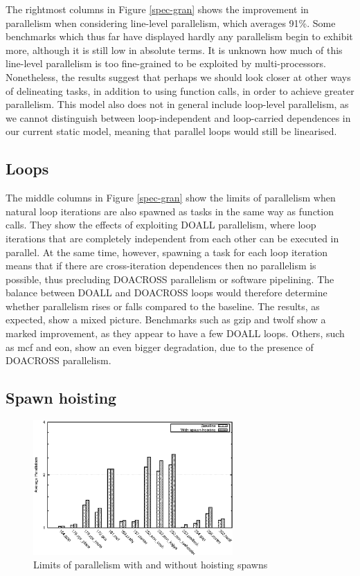 The rightmost columns in Figure \ref{spec-gran} shows the improvement in parallelism when considering line-level parallelism, which averages 91\%.
Some benchmarks which thus far have displayed hardly any parallelism begin to exhibit more, although it is still low in absolute terms.
It is unknown how much of this line-level parallelism is too fine-grained to be exploited by multi-processors.
Nonetheless, the results suggest that perhaps we should look closer at other ways of delineating tasks, in addition to using function calls, in order to achieve greater parallelism.
This model also does not in general include loop-level parallelism, as we cannot distinguish between loop-independent and loop-carried dependences in our current static model, meaning that parallel loops would still be linearised.

\subsection{Loops}

The middle columns in Figure \ref{spec-gran} show the limits of parallelism when natural loop iterations are also spawned as tasks in the same way as function calls.
They show the effects of exploiting DOALL parallelism, where loop iterations that are completely independent from each other can be executed in parallel.
At the same time, however, spawning a task for each loop iteration means that if there are cross-iteration dependences then no parallelism is possible, thus precluding DOACROSS parallelism or software pipelining.
The balance between DOALL and DOACROSS loops would therefore determine whether parallelism rises or falls compared to the baseline.
The results, as expected, show a mixed picture.
Benchmarks such as gzip and twolf show a marked improvement, as they appear to have a few DOALL loops.
Others, such as mcf and eon, show an even bigger degradation, due to the presence of DOACROSS parallelism.

\subsection{Spawn hoisting}

\begin{figure}
 \centering
 \includegraphics[width=3in]{spec-hoist}
 \caption{Limits of parallelism with and without hoisting spawns}
 \label{spec-hoist}
\end{figure}

